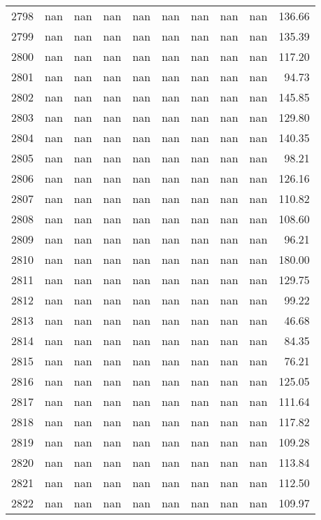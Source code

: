 \begin{tabular}{lrrrrrrrrr}
2798 & nan & nan & nan & nan & nan & nan & nan & nan & 136.66 \\
2799 & nan & nan & nan & nan & nan & nan & nan & nan & 135.39 \\
2800 & nan & nan & nan & nan & nan & nan & nan & nan & 117.20 \\
2801 & nan & nan & nan & nan & nan & nan & nan & nan & 94.73 \\
2802 & nan & nan & nan & nan & nan & nan & nan & nan & 145.85 \\
2803 & nan & nan & nan & nan & nan & nan & nan & nan & 129.80 \\
2804 & nan & nan & nan & nan & nan & nan & nan & nan & 140.35 \\
2805 & nan & nan & nan & nan & nan & nan & nan & nan & 98.21 \\
2806 & nan & nan & nan & nan & nan & nan & nan & nan & 126.16 \\
2807 & nan & nan & nan & nan & nan & nan & nan & nan & 110.82 \\
2808 & nan & nan & nan & nan & nan & nan & nan & nan & 108.60 \\
2809 & nan & nan & nan & nan & nan & nan & nan & nan & 96.21 \\
2810 & nan & nan & nan & nan & nan & nan & nan & nan & 180.00 \\
2811 & nan & nan & nan & nan & nan & nan & nan & nan & 129.75 \\
2812 & nan & nan & nan & nan & nan & nan & nan & nan & 99.22 \\
2813 & nan & nan & nan & nan & nan & nan & nan & nan & 46.68 \\
2814 & nan & nan & nan & nan & nan & nan & nan & nan & 84.35 \\
2815 & nan & nan & nan & nan & nan & nan & nan & nan & 76.21 \\
2816 & nan & nan & nan & nan & nan & nan & nan & nan & 125.05 \\
2817 & nan & nan & nan & nan & nan & nan & nan & nan & 111.64 \\
2818 & nan & nan & nan & nan & nan & nan & nan & nan & 117.82 \\
2819 & nan & nan & nan & nan & nan & nan & nan & nan & 109.28 \\
2820 & nan & nan & nan & nan & nan & nan & nan & nan & 113.84 \\
2821 & nan & nan & nan & nan & nan & nan & nan & nan & 112.50 \\
2822 & nan & nan & nan & nan & nan & nan & nan & nan & 109.97 \\

\end{tabular}
